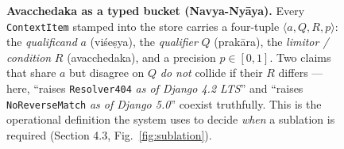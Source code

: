 \begin{figure}[!tbp]
{}
\caption{\textbf{Avacchedaka as a typed bucket (Navya-Ny\=aya).}
Every \texttt{ContextItem} stamped into the store carries a four-tuple
$\langle a, Q, R, p\rangle$: the \emph{qualificand} $a$ (vi\'se\d{s}ya),
the \emph{qualifier} $Q$ (prak\=ara), the \emph{limitor / condition} $R$
(avacchedaka), and a precision $p\in[0,1]$.
Two claims that share $a$ but disagree on $Q$ \emph{do not} collide if
their $R$ differs --- here, ``raises \texttt{Resolver404}
\emph{as of Django 4.2 LTS}'' and ``raises \texttt{NoReverseMatch}
\emph{as of Django 5.0}'' coexist truthfully.
This is the operational definition the system uses to decide
\emph{when} a sublation is required (Section 4.3, Fig.~\ref{fig:sublation}).}
\label{fig:avacchedaka}
\end{figure}
